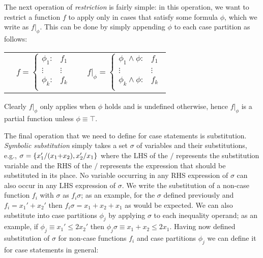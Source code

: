 The next operation of \emph{restriction} is fairly simple: in this
operation, we want to restrict a function $f$ to apply only in cases
that satisfy some formula $\phi$, which we write as $f|_{\phi}$.  
This can be done by simply appending $\phi$ to each case partition
as follows:
{\footnotesize
\begin{center}
\begin{tabular}{r c c l}
&
\hspace{-6mm} 
  $f = \begin{cases}
    \phi_1: & f_1 \\ 
   \vdots&\vdots\\ 
    \phi_k: & f_k \\ 
  \end{cases}$
&

&
\hspace{-2mm}
  $f|_{\phi} = \begin{cases}
    \phi_1 \land \phi : & f_1 \\ 
   \vdots&\vdots\\ 
    \phi_k \land \phi : & f_k \\ 
  \end{cases}$
\end{tabular}
\end{center}
}
Clearly $f|_{\phi}$ only applies when $\phi$ holds and is
undefined otherwise, hence $f|_{\phi}$ is a partial function
unless $\phi \equiv \top$.

The final operation that we need to define for case statements is
substitution.  \emph{Symbolic substitution} simply takes a set
$\sigma$ of variables and their substitutions, e.g., $\sigma = \{ x_1'
/ (x_1 \hspace{-.8mm} + \hspace{-.8mm} x_2), x_2' / x_1 \}$ where the
LHS of the $/$ represents the substitution variable and the RHS of the
$/$ represents the expression that should be substituted in its place.
No variable occurring in any RHS expression of $\sigma$ can also occur
in any LHS expression of $\sigma$.  We write the substitution of a
non-case function $f_i$ with $\sigma$ as $f_i\sigma$; as an example,
for the $\sigma$ defined previously and $f_i = x_1' + x_2'$ then
$f_i\sigma = x_1 + x_2 + x_1$ as would be expected.  We can also
substitute into case partitions $\phi_j$ by applying $\sigma$ to each
inequality operand; as an example, if $\phi_j \equiv x_1' \leq 2x_2'$ 
then $\phi_j \sigma \equiv x_1 + x_2 \leq 2x_1$.  
Having now defined substitution of $\sigma$ for non-case
functions $f_i$ and case partitions $\phi_j$ we can define it for case
statements in general:

